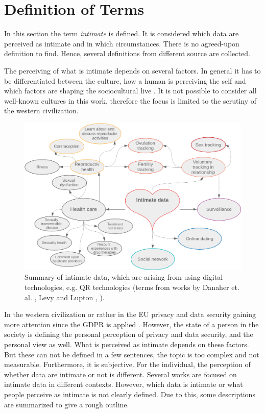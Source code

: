 \section{Definition of Terms}
\label{sec:terms_of_definition}
In this section the term \textit{intimate} is defined. It is considered which data are perceived as intimate and in which circumstances. There is no agreed-upon definition to find. Hence, several definitions from different source are collected.

The perceiving of what is intimate depends on several factors.
In general it has to be differentiated between the culture, how a human is perceiving the self and which factors are shaping the sociocultural live \cite{carrithers1985category}. It is not possible to consider all well-known cultures in this work, therefore the focus is limited to the scrutiny of the western civilization. 
\begin{figure}[htb]
	\centering
	\includegraphics[width=\linewidth]{img/cluster_heart.png}
	\caption{Summary of intimate data, which are arising from using digital technologies, e.g. \acl{QR} technologies (terms from works by Danaher et. al. \cite{doi:10.1080/15265161.2017.1409823}, Levy \cite{levy2014intimate} and Lupton \cite{doi:10.1080/13691058.2014.920528}, \cite{lupton2016quantified}).}
	\label{fig:cluster}
\end{figure}
In the western civilization or rather in the \ac{EU} privacy and data security gaining more attention since the \ac{GDPR} is applied \cite{albrecht2016gdpr}.
However, the state of a person in the society is defining the personal perception of privacy and data security, and the personal view as well. What is perceived as intimate depends on these factors.
But these can not be defined in a few sentences, the topic is too complex and not measurable. Furthermore, it is subjective. For the individual, the perception of whether data are intimate or not is different. 
Several works are focused on intimate data in different contexts. However, which data is intimate or what people perceive as intimate is not clearly defined. Due to this, some descriptions are summarized to give a rough outline.

